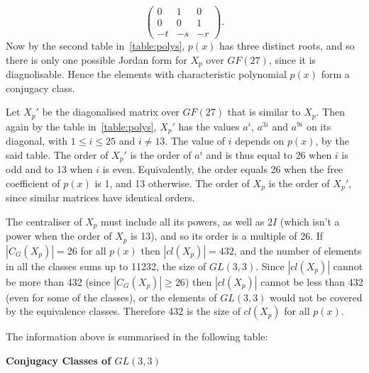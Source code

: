 \documentclass[11pt]{article} \usepackage{amssymb}
\begin{document}
\begin{enumerate}
\begin{enumerate}
\begin{itemize}
\begin{equation*}
          \begin{pmatrix}
            0&1  &0 \\ 
            0&0  &1 \\ 
            -t&-s  &-r 
          \end{pmatrix}.
        \end{equation*}
        Now by the second table in~\ref{table:polys}, $p(x)$ has three 
        distinct roots, and so there is only one possible Jordan form for $X_p$
        over $GF(27)$, since it is diagnolisable.
        Hence the elements with characteristic polynomial $p(x)$
        form a conjugacy class.
        
        Let $X_p'$ be the diagonalised matrix over $GF(27)$ that is similar
        to $X_p$. Then again by the table in~\ref{table:polys}, $X_p'$ has
        the values $a^i$, $a^{3i}$ and $a^{9i}$ on its diagonal, with $1 \leq i \leq 25$ and
        $i \neq 13$. The value of $i$ depends on $p(x)$, by the said table.
        The order of $X_p'$ is the order of $a^i$
        and is thus equal to $26$ when $i$ is odd and to 13 when $i$ is even.
        Equivalently, the order equals
        26 when the free coefficient of $p(x)$ is 1, and 13 otherwise.
        The order of $X_p$ is the order of $X_p'$, 
        since similar matrices have identical orders.

        The centraliser of $X_p$ must include all its powers, as well as
        $2I$ (which isn't a power when the order of $X_p$ is 13), and so its 
        order is a multiple of 26. If $|C_G(X_p)|=26$ for all $p(x)$ then
        $|cl(X_p)|=432$, and the number of elements in all the classes sums
        up to 11232, the size of $GL(3,3)$. Since $|cl(X_p)|$ cannot be more
        than 432 (since $|C_G(X_p)| \geq 26$) then $|cl(X_p)|$ cannot be less
        than 432 (even for some of the classes), or the elements of $GL(3,3)$ 
        would not be covered by the
        equivalence classes. Therefore 432 is the size of $cl(X_p)$
        for all $p(x)$. 
      \end{itemize}
      The information above is summarised in the following table:

      {\bf Conjugacy Classes of $GL(3,3)$}


\end{enumerate}
\end{enumerate}
\end{document}
